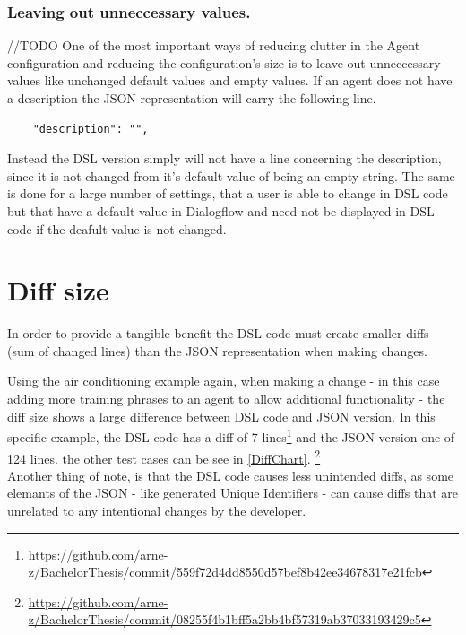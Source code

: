 \subsubsection{Leaving out unneccessary values.}
//TODO
One of the most important ways of reducing clutter in the Agent configuration and reducing the configuration's size is to leave out unneccessary values like unchanged default values and empty values.
If an agent does not have a description the JSON representation will carry the following line.
\begin{verbatim}
    "description": "",
\end{verbatim}
Instead the DSL version simply will not have a line concerning the description, since it is not changed from it's default value of being an empty string.
The same is done for a large number of settings, that a user is able to change in DSL code but that have a default value in Dialogflow and need not be displayed in DSL code if the deafult value is not changed.


\section{Diff size}
In order to provide a tangible benefit the DSL code must create smaller diffs (sum of changed lines) than the JSON representation when making changes.

Using the air conditioning example again, when making a change - in this case adding more training phrases to an agent to allow additional functionality - the diff size shows a large difference between DSL code and JSON version. In this specific example, the DSL code has a diff of 7 lines\footnote{\url{https://github.com/arne-z/BachelorThesis/commit/559f72d4dd8550d57bef8b42ee34678317e21fcb}} and the JSON version one of 124 lines. the other test cases can be see in \autoref{DiffChart}.
\footnote{\url{https://github.com/arne-z/BachelorThesis/commit/08255f4b1bff5a2bb4bf57319ab37033193429c5}}\\
Another thing of note, is that the DSL code causes less unintended diffs, as some elemants of the JSON - like generated Unique Identifiers - can cause diffs that are unrelated to any intentional changes by the developer.


